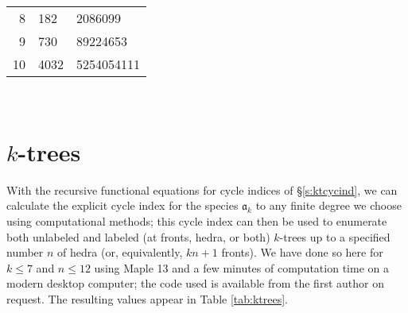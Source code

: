 \documentclass[sectionflow,singlespace,twoside,boldmathhdr]{brandiss} %
\numberwithin{section}{chapter}
\numberwithin{figure}{chapter}
\begin{document}
\begin{table}[htb]
{\begin{tabular}{r | l l}
      8 & 182 & 2086099 \\
      9 & 730 & 89224653 \\
      10 & 4032 & 5254054111
    \end{tabular}
  }
  \qquad
  \\
\end{table}

\section{$k$-trees}\label{s:ktenum}
With the recursive functional equations for cycle indices of \S \ref{s:ktcycind}, we can calculate the explicit cycle index for the species $\mathfrak{a}_{k}$ to any finite degree we choose using computational methods; this cycle index can then be used to enumerate both unlabeled and labeled (at fronts, hedra, or both) $k$-trees up to a specified number $n$ of hedra (or, equivalently, $kn + 1$ fronts).
We have done so here for $k \leq 7$ and $n \leq 12$ using Maple 13 and a few minutes of computation time on a modern desktop computer; the code used is available from the first author on request.
The resulting values appear in Table \ref{tab:ktrees}.
\end{document}
